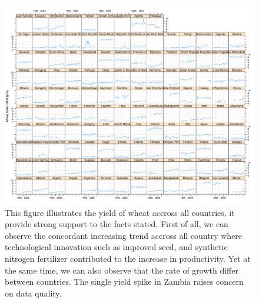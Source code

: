 \documentclass[nojss]{jss}\usepackage[]{graphicx}\usepackage[]{color}
\makeatletter
\def\maxwidth{ %
  \ifdim\Gin@nat@width>\linewidth
    \linewidth
  \else
    \Gin@nat@width
  \fi
}
\newenvironment{knitrout}{}{} %
\makeatother
\begin{document}
\begin{knitrout}
\color{fgcolor}\begin{figure}[!ht]


{\centering \includegraphics[width=\maxwidth]{figure/wheat-yield-explore} 

}

\caption[This figure illustrates the yield of wheat accross all countries, it provide strong support to the facts stated]{This figure illustrates the yield of wheat accross all countries, it provide strong support to the facts stated. First of all, we can observe the concordant increasing trend accross all country where technological innovation such as improved seed, and synthetic nitrogen fertilizer contributed to the increase in productivity. Yet at the same time, we can also observe that the rate of growth differ between countries. The single yield spike in Zambia raises concern on data quality.\label{fig:wheat-yield-explore}}
\end{figure}


\end{knitrout}
\end{document}

